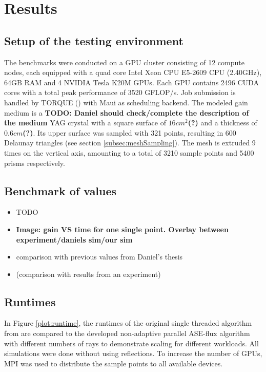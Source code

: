 \section{Results}

\subsection{Setup of the testing environment}

The benchmarks were conducted on a GPU cluster consisting of 12 compute nodes,
each equipped with a quad core Intel Xeon CPU E5-2609 CPU (2.40GHz), 64GB RAM
and 4 NVIDIA Tesla K20M GPUs. Each GPU contains 2496 CUDA cores with a total
peak performance of 3520 GFLOP/s. Job submission is handled by TORQUE
(\cite{torque}) with Maui as scheduling backend. The modeled gain medium is a
\textbf{TODO: Daniel should check/complete the description of the medium} YAG
crystal with a square surface of $16cm^2$\textbf{(?)} and a thickness of
$0.6cm$\textbf{(?)}. Its upper surface was sampled with 321 points, resulting in
600 Delaunay triangles (see section \ref{subsec:meshSampling}). The mesh is
extruded 9 times on the vertical axis, amounting to a total of 3210 sample
points and 5400 prisms respectively.

\subsection{Benchmark of values}

\begin{itemize}

  \item TODO

  \item \textbf{Image: gain VS time for one single point. Overlay between
    experiment/daniels sim/our sim}

  \item comparison with previous values from Daniel's thesis

  \item (comparison with results from an experiment)

\end{itemize}


\subsection{Runtimes}
In Figure \ref{plot:runtime}, the runtimes of the original single threaded
algorithm from \cite{ASE2010} are compared to the developed non-adaptive
parallel ASE-flux algorithm with different numbers of rays to demonstrate
scaling for different workloads. All simulations were done without using
reflections. To increase the number of GPUs, MPI\cite{MPI} was used to distribute the
sample points to all available devices. 

